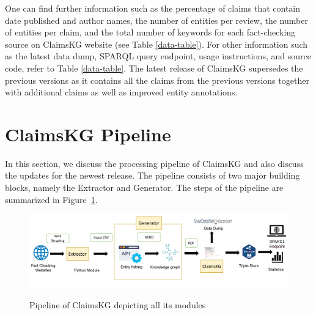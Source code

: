 \documentclass[
]{ceurart}
\begin{document}
 One can find further information such as the percentage of claims that contain date published and author names, the number of entities per review, the number of entities per claim, and the total number of keywords for each fact-checking source on ClaimsKG website (see Table \ref{data-table}).  For other information such as the latest data dump, SPARQL query endpoint, usage instructions, and source code, refer to Table \ref{data-table}. The latest release of ClaimsKG supersedes the previous versions as it contains all the claims from the previous
versions together with additional claims as well as improved entity annotations.
\vspace{-2mm}


\section{ClaimsKG Pipeline}\label{pipeline}
\vspace{-2mm}
In this section, we discuss the processing pipeline of ClaimsKG and also discuss the updates for the newest release. %
The pipeline consists of two major building blocks, namely the Extractor and Generator. %
The steps of the pipeline are summarized in Figure~\ref{fig1}. 
\vspace{-2mm}
\begin{figure}[ht]
\centering
\caption{Pipeline of ClaimsKG depicting all its modules}
\includegraphics[width=0.75\linewidth]{claimkg}
\vspace{-8mm}
\label{fig1}
\end{figure}
\end{document}

